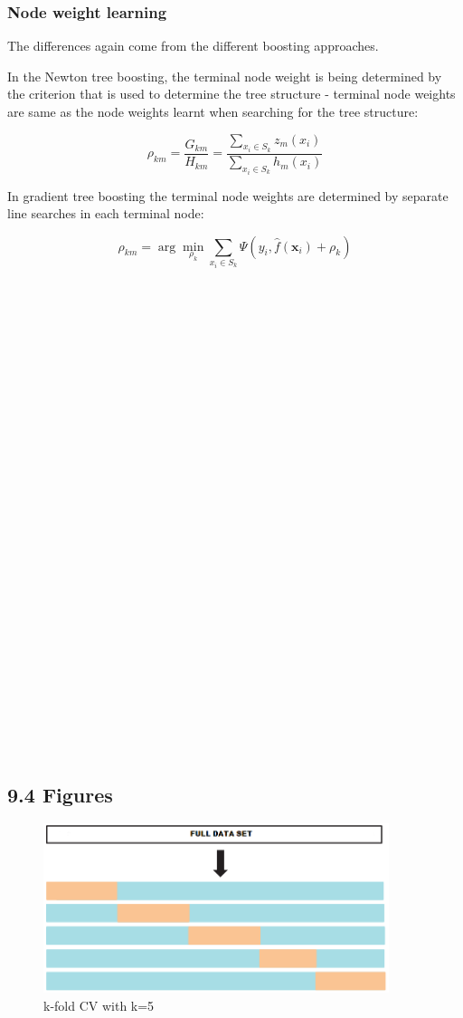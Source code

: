 \documentclass[12pt,]{article}
\begin{document}
\hypertarget{node-weight-learning}{%
\subsubsection{Node weight learning}\label{node-weight-learning}}

The differences again come from the different boosting approaches.

In the Newton tree boosting, the terminal node weight is being
determined by the criterion that is used to determine the tree structure
- terminal node weights are same as the node weights learnt when
searching for the tree structure:

\[\rho_{km}=\frac{G_{km}}{H_{km}}=\frac{\sum_{x_i\in S_k}z_m(x_i)}{\sum_{x_i\in S_k}h_m(x_i)}\]

In gradient tree boosting the terminal node weights are determined by
separate line searches in each terminal node:

\[\rho_{km} = \arg\min_{\rho_k}\sum_{x_i\in S_k}\Psi(y_i,\widehat{f}(\mathbf{x}_{i})+\rho_k)\]

\(\;\)

\(\;\)

\(\;\)

\(\;\)

\(\;\)

\(\;\)

\(\;\)

\(\;\)

\(\;\)

\(\;\)

\(\;\)

\(\;\)

\(\;\)

\(\;\)

\(\;\)

\(\;\)

\hypertarget{figures}{%
\subsection{9.4 Figures}\label{figures}}

\begin{figure}
\centering
\includegraphics[width=0.9\textwidth,height=\textheight]{figures/crossval.png}
\caption{k-fold CV with k=5}
\end{figure}
\end{document}
